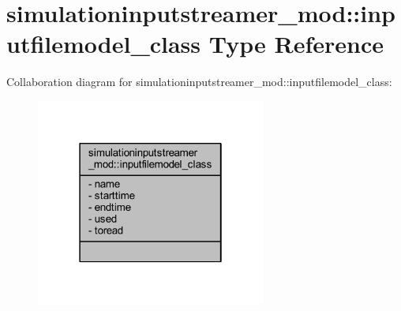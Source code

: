 \hypertarget{structsimulationinputstreamer__mod_1_1inputfilemodel__class}{}\section{simulationinputstreamer\+\_\+mod\+:\+:inputfilemodel\+\_\+class Type Reference}
\label{structsimulationinputstreamer__mod_1_1inputfilemodel__class}


Collaboration diagram for simulationinputstreamer\+\_\+mod\+:\+:inputfilemodel\+\_\+class\+:\nopagebreak
\begin{figure}[H]
\begin{center}
\leavevmode
\includegraphics[width=214pt]{structsimulationinputstreamer__mod_1_1inputfilemodel__class__coll__graph}
\end{center}
\end{figure}
